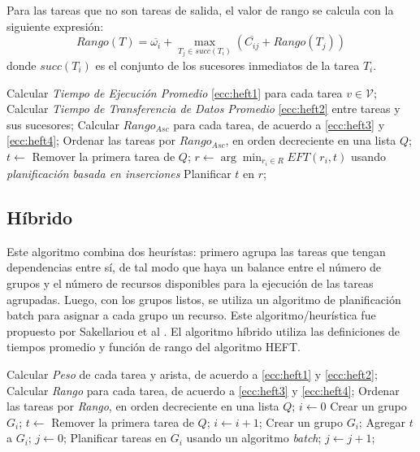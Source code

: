 Para las tareas que no son tareas de  salida, el valor de rango se calcula con la siguiente expresión:
\begin{equation}
\label{ecc:heft4}
Rango(T) = \overline{\omega_i} + \max_{T_j \in succ(T_i)} ( \overline{C_{ij}} + Rango(T_j) )
\end{equation}
donde $succ(T_i)$ es el conjunto de los sucesores inmediatos de la tarea $T_i$.

\label{alg:heft}
\begin{algorithmic}[1]
\State Calcular \emph{Tiempo de Ejecución Promedio} \ref{ecc:heft1} para cada tarea $v \in \mathcal{V}$;
\State Calcular \emph{Tiempo de Transferencia de Datos Promedio} \ref{ecc:heft2} entre tareas y sus sucesores;
\State Calcular $Rango_{Asc}$ para cada tarea, de acuerdo a \ref{ecc:heft3} y \ref{ecc:heft4};
\State Ordenar las tareas por $Rango_{Asc}$, en orden decreciente en una lista $Q$;
	\State $t \gets$ Remover la primera tarea de $Q$;
	\State $r \gets \arg\min_{r_i \in R}EFT(r_i, t)$ usando \emph{planificación basada en inserciones}
	\State Planificar $t$ en $r$;
\EndWhile
\end{algorithmic}

\subsection{Híbrido}
Este algoritmo combina dos heurístas: primero agrupa las tareas que tengan dependencias entre sí, de tal modo que haya un balance entre el número de grupos y el número de recursos disponibles para la ejecución de las tareas agrupadas. Luego, con los grupos listos, se utiliza un algoritmo de planificación batch para asignar a cada grupo un recurso. Este algoritmo/heurística fue propuesto por Sakellariou et al \cite{sakellariou2004hybrid}. El algoritmo híbrido utiliza las definiciones de tiempos promedio y función de rango del algoritmo HEFT.

\label{alg:hybrid}
\begin{algorithmic}[1]
\State Calcular \emph{Peso} de cada tarea y arista, de acuerdo a \ref{ecc:heft1} y \ref{ecc:heft2};
\State Calcular \emph{Rango} para cada tarea, de acuerdo a \ref{ecc:heft3} y \ref{ecc:heft4};
\State Ordenar las tareas por \emph{Rango}, en orden decreciente en una lista $Q$;
\State $i \gets 0$
\State Crear un grupo $G_i$;
	\State $t \gets$ Remover la primera tarea de $Q$;
		\State $i \gets i + 1$;
		\State Crear un grupo $G_i$;
	\EndIf
	\State Agregar $t$ a $G_i$;
\EndWhile
\State $j \gets 0$;
	\State Planificar tareas en $G_i$ usando un algoritmo \emph{batch};
	\State $j \gets j + 1$;
\EndWhile
\end{algorithmic}

